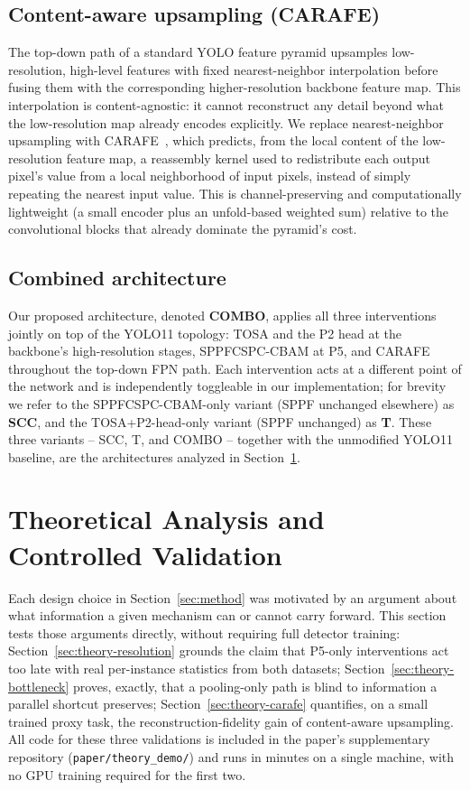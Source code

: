 \documentclass[conference]{IEEEtran}
\begin{document}
\subsection{Content-aware upsampling (CARAFE)}
\label{sec:method-carafe}

The top-down path of a standard YOLO feature pyramid upsamples
low-resolution, high-level features with fixed nearest-neighbor
interpolation before fusing them with the corresponding higher-resolution
backbone feature map. This interpolation is content-agnostic: it cannot
reconstruct any detail beyond what the low-resolution map already encodes
explicitly. We replace nearest-neighbor upsampling with
CARAFE~\cite{wang2019carafe}, which predicts, from the local content of the
low-resolution feature map, a reassembly kernel used to redistribute each
output pixel's value from a local neighborhood of input pixels, instead of
simply repeating the nearest input value. This is channel-preserving and
computationally lightweight (a small encoder plus an unfold-based weighted
sum) relative to the convolutional blocks that already dominate the
pyramid's cost.

\subsection{Combined architecture}
\label{sec:method-combined}

Our proposed architecture, denoted \textbf{COMBO}, applies all three
interventions jointly on top of the YOLO11 topology: TOSA and the P2 head
at the backbone's high-resolution stages, SPPFCSPC-CBAM at P5, and CARAFE
throughout the top-down FPN path. Each intervention acts at a different
point of the network and is independently toggleable in our
implementation; for brevity we refer to the SPPFCSPC-CBAM-only variant
(SPPF unchanged elsewhere) as \textbf{SCC}, and the TOSA+P2-head-only
variant (SPPF unchanged) as \textbf{T}. These three variants -- SCC, T,
and COMBO -- together with the unmodified YOLO11 baseline, are the
architectures analyzed in Section~\ref{sec:theory}.

\section{Theoretical Analysis and Controlled Validation}
\label{sec:theory}

Each design choice in Section~\ref{sec:method} was motivated by an
argument about what information a given mechanism can or cannot carry
forward. This section tests those arguments directly, without requiring
full detector training: Section~\ref{sec:theory-resolution} grounds the
claim that P5-only interventions act too late with real per-instance
statistics from both datasets; Section~\ref{sec:theory-bottleneck} proves,
exactly, that a pooling-only path is blind to information a parallel
shortcut preserves; Section~\ref{sec:theory-carafe} quantifies, on a small
trained proxy task, the reconstruction-fidelity gain of content-aware
upsampling. All code for these three validations is included in the
paper's supplementary repository (\texttt{paper/theory\_demo/}) and runs
in minutes on a single machine, with no GPU training required for the
first two.
\end{document}
